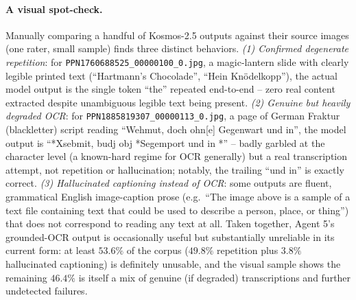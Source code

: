 \documentclass[12pt,a4paper]{report}
\begin{document}
\paragraph{A visual spot-check.} Manually comparing a handful of Kosmos-2.5 outputs against their source images (one rater, small sample) finds three distinct behaviors. \textit{(1) Confirmed degenerate repetition}: for \texttt{PPN1760688525\_00000100\_0.jpg}, a magic-lantern slide with clearly legible printed text (``Hartmann's Chocolade'', ``Hein Knödelkopp''), the actual model output is the single token ``the'' repeated end-to-end -- zero real content extracted despite unambiguous legible text being present. \textit{(2) Genuine but heavily degraded OCR}: for \texttt{PPN1885819307\_00000113\_0.jpg}, a page of German Fraktur (blackletter) script reading ``Wehmut, doch ohn[e] Gegenwart und in'', the model output is ``*Xsebmit, budj obj *Segemport und in *'' -- badly garbled at the character level (a known-hard regime for OCR generally) but a real transcription attempt, not repetition or hallucination; notably, the trailing ``und in'' is exactly correct. \textit{(3) Hallucinated captioning instead of OCR}: some outputs are fluent, grammatical English image-caption prose (e.g.\ ``The image above is a sample of a text file containing text that could be used to describe a person, place, or thing'') that does not correspond to reading any text at all. Taken together, Agent 5's grounded-OCR output is occasionally useful but substantially unreliable in its current form: at least $53.6\%$ of the corpus ($49.8\%$ repetition plus $3.8\%$ hallucinated captioning) is definitely unusable, and the visual sample shows the remaining $46.4\%$ is itself a mix of genuine (if degraded) transcriptions and further undetected failures.
\end{document}
